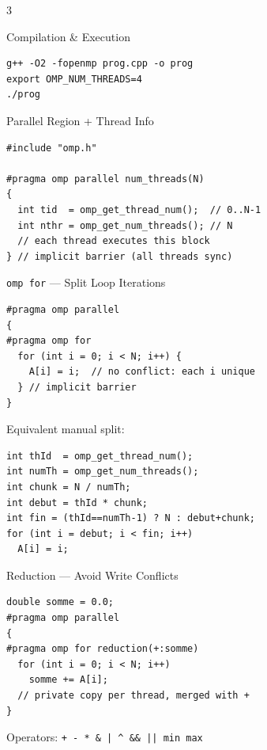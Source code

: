 \documentclass[8pt,a4paper,landscape]{article}
\begin{document}
\begin{center}
\colorbox{titlebg}{}
\end{center}
\vspace{2mm}


\begin{multicols}{3}

\begin{sectionbox}{Compilation \& Execution}
\begin{lstlisting}
g++ -O2 -fopenmp prog.cpp -o prog
export OMP_NUM_THREADS=4
./prog
\end{lstlisting}
\end{sectionbox}

\begin{sectionbox}{Parallel Region + Thread Info}
\begin{lstlisting}
#include "omp.h"

#pragma omp parallel num_threads(N)
{
  int tid  = omp_get_thread_num();  // 0..N-1
  int nthr = omp_get_num_threads(); // N
  // each thread executes this block
} // implicit barrier (all threads sync)
\end{lstlisting}
\end{sectionbox}

\begin{sectionbox}{\texttt{omp for} --- Split Loop Iterations}
\begin{lstlisting}
#pragma omp parallel
{
#pragma omp for
  for (int i = 0; i < N; i++) {
    A[i] = i;  // no conflict: each i unique
  } // implicit barrier
}
\end{lstlisting}
\vspace{2pt}
{\scriptsize\color{cmt} Equivalent manual split:}
\begin{lstlisting}
int thId  = omp_get_thread_num();
int numTh = omp_get_num_threads();
int chunk = N / numTh;
int debut = thId * chunk;
int fin = (thId==numTh-1) ? N : debut+chunk;
for (int i = debut; i < fin; i++)
  A[i] = i;
\end{lstlisting}
\end{sectionbox}

\begin{highlightbox}{Reduction --- Avoid Write Conflicts}
\begin{lstlisting}
double somme = 0.0;
#pragma omp parallel
{
#pragma omp for reduction(+:somme)
  for (int i = 0; i < N; i++)
    somme += A[i];
  // private copy per thread, merged with +
}
\end{lstlisting}
{\scriptsize Operators: \texttt{+ - * \& | \^{} \&\& || min max}}
\vspace{3pt}


\end{highlightbox}
\end{multicols}
\end{document}
